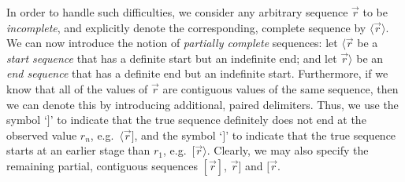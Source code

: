 \documentclass[a4paper]{article}
\begin{document}
In order to handle such difficulties, we consider any arbitrary sequence $\vec{r}$ to be {\em incomplete},
and explicitly denote the corresponding, complete sequence by $\langle\vec{r}\rangle$.
We can now introduce the notion of {\em partially complete} sequences:
let  $\langle\vec{r}$ be a {\em start sequence} that has a definite start but an indefinite end;
and let $\vec{r}\rangle$ be an {\em end sequence} that has a definite end but an indefinite start.
Furthermore, if we know that all of the values of $\vec{r}$ are contiguous values of the same sequence,
then we can denote this by introducing additional, paired delimiters.
Thus, we use the symbol `$]$' to indicate that the true sequence definitely does not end at the observed
value $r_n$, e.g.\ $\langle\vec{r}]$, and the symbol `$]$' to indicate that the true sequence starts at an earlier stage than $r_1$, e.g.\ $[\vec{r}\rangle$.
Clearly, we may also specify the remaining partial, contiguous sequences $[\vec{r}]$, $\vec{r}]$ and $[\vec{r}$.
\end{document}
